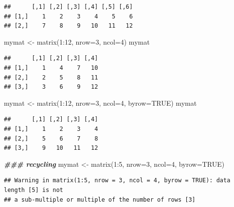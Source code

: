 \documentclass[
]{book}
\newenvironment{Shaded}{\begin{snugshade}}{\end{snugshade}}
\newcommand{\AttributeTok}[1]{\textcolor[rgb]{0.77,0.63,0.00}{#1}}
\newcommand{\ConstantTok}[1]{\textcolor[rgb]{0.00,0.00,0.00}{#1}}
\newcommand{\DecValTok}[1]{\textcolor[rgb]{0.00,0.00,0.81}{#1}}
\newcommand{\DocumentationTok}[1]{\textcolor[rgb]{0.56,0.35,0.01}{\textbf{\textit{#1}}}}
\newcommand{\FunctionTok}[1]{\textcolor[rgb]{0.00,0.00,0.00}{#1}}
\newcommand{\NormalTok}[1]{#1}
\newcommand{\OtherTok}[1]{\textcolor[rgb]{0.56,0.35,0.01}{#1}}
\newcommand{\SpecialCharTok}[1]{\textcolor[rgb]{0.00,0.00,0.00}{#1}}
\begin{document}
\begin{verbatim}
##      [,1] [,2] [,3] [,4] [,5] [,6]
## [1,]    1    2    3    4    5    6
## [2,]    7    8    9   10   11   12
\end{verbatim}

\begin{Shaded}
\begin{Highlighting}[]
\NormalTok{mymat }\OtherTok{\textless{}{-}} \FunctionTok{matrix}\NormalTok{(}\DecValTok{1}\SpecialCharTok{:}\DecValTok{12}\NormalTok{, }\AttributeTok{nrow=}\DecValTok{3}\NormalTok{, }\AttributeTok{ncol=}\DecValTok{4}\NormalTok{)}
\NormalTok{mymat}
\end{Highlighting}
\end{Shaded}

\begin{verbatim}
##      [,1] [,2] [,3] [,4]
## [1,]    1    4    7   10
## [2,]    2    5    8   11
## [3,]    3    6    9   12
\end{verbatim}

\begin{Shaded}
\begin{Highlighting}[]
\NormalTok{mymat }\OtherTok{\textless{}{-}} \FunctionTok{matrix}\NormalTok{(}\DecValTok{1}\SpecialCharTok{:}\DecValTok{12}\NormalTok{, }\AttributeTok{nrow=}\DecValTok{3}\NormalTok{, }\AttributeTok{ncol=}\DecValTok{4}\NormalTok{, }\AttributeTok{byrow=}\ConstantTok{TRUE}\NormalTok{)}
\NormalTok{mymat}
\end{Highlighting}
\end{Shaded}

\begin{verbatim}
##      [,1] [,2] [,3] [,4]
## [1,]    1    2    3    4
## [2,]    5    6    7    8
## [3,]    9   10   11   12
\end{verbatim}

\begin{Shaded}
\begin{Highlighting}[]
\DocumentationTok{\#\#\# recycling}
\NormalTok{mymat }\OtherTok{\textless{}{-}} \FunctionTok{matrix}\NormalTok{(}\DecValTok{1}\SpecialCharTok{:}\DecValTok{5}\NormalTok{, }\AttributeTok{nrow=}\DecValTok{3}\NormalTok{, }\AttributeTok{ncol=}\DecValTok{4}\NormalTok{, }\AttributeTok{byrow=}\ConstantTok{TRUE}\NormalTok{)}
\end{Highlighting}
\end{Shaded}

\begin{verbatim}
## Warning in matrix(1:5, nrow = 3, ncol = 4, byrow = TRUE): data length [5] is not
## a sub-multiple or multiple of the number of rows [3]
\end{verbatim}
\end{document}
